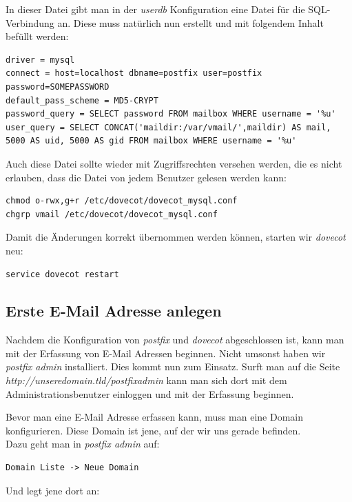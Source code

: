In dieser Datei gibt man in der \textit{userdb} Konfiguration eine Datei für die SQL-Verbindung an. Diese muss natürlich nun erstellt und mit folgendem Inhalt befüllt werden:

\begin{lstlisting}
driver = mysql
connect = host=localhost dbname=postfix user=postfix password=SOMEPASSWORD
default_pass_scheme = MD5-CRYPT
password_query = SELECT password FROM mailbox WHERE username = '%u'
user_query = SELECT CONCAT('maildir:/var/vmail/',maildir) AS mail, 5000 AS uid, 5000 AS gid FROM mailbox WHERE username = '%u'
\end{lstlisting}

Auch diese Datei sollte wieder mit Zugriffsrechten versehen werden, die es nicht erlauben, dass die Datei von jedem Benutzer gelesen werden kann:

\begin{lstlisting}
chmod o-rwx,g+r /etc/dovecot/dovecot_mysql.conf
chgrp vmail /etc/dovecot/dovecot_mysql.conf
\end{lstlisting}

Damit die Änderungen korrekt übernommen werden können, starten wir \textit{dovecot} neu:

\begin{lstlisting}
service dovecot restart
\end{lstlisting}

\subsection{Erste E-Mail Adresse anlegen}
Nachdem die Konfiguration von \textit{postfix} und \textit{dovecot} abgeschlossen ist, kann man mit der Erfassung von E-Mail Adressen beginnen. Nicht umsonst haben wir \textit{postfix admin} installiert. Dies kommt nun zum Einsatz. Surft man auf die Seite \textit{http://unseredomain.tld/postfixadmin} kann man sich dort mit dem Administrationsbenutzer einloggen und mit der Erfassung beginnen.

Bevor man eine E-Mail Adresse erfassen kann, muss man eine Domain konfigurieren. Diese Domain ist jene, auf der wir uns gerade befinden. \\
Dazu geht man in \textit{postfix admin} auf:

\begin{lstlisting}
Domain Liste -> Neue Domain
\end{lstlisting}

Und legt jene dort an:

